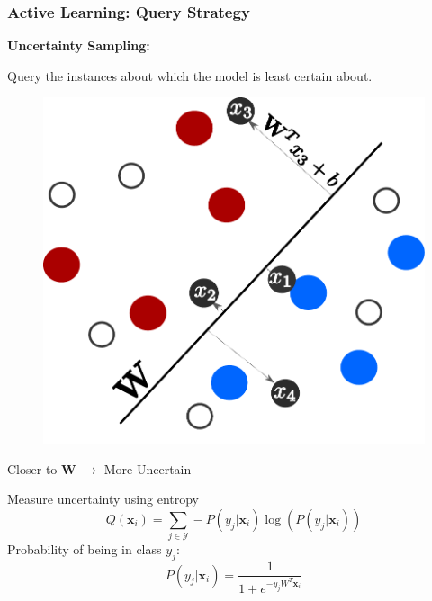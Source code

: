 \documentclass[11pts]{beamer}
\begin{document}
\begin{frame}%
\frametitle{Active Learning: Query Strategy}
\textbf{Uncertainty Sampling:}

\vspace*{0.2cm}
Query the instances about which the model is least certain about.

\vspace*{0.35cm}
\begin{minipage}{0.45\textwidth}
\begin{figure}
  \begin{center}
    \includegraphics[scale=0.35]{IM/UN_M.pdf}
  \end{center}
\end{figure}

\end{minipage}
\hfill
\begin{minipage}{0.5\textwidth}
Closer to  $\mathbf{W}$ $\rightarrow$ 
More Uncertain

\vspace*{0.2cm}
Measure uncertainty using entropy
\begin{equation*}
    Q(\mathbf{x}_{i}) = \sum_{j\in \mathcal{Y}}-P(y_{j}|\mathbf{x}_{i})\log\left(P(y_{j}|\mathbf{x}_{i})\right)
\end{equation*}
Probability of being in class $y_{j}$:
\begin{equation*}
    P(y_{j}|\mathbf{x}_{i})=\frac{1}{1+e^{-y_{j}W^{T}\mathbf{x}_{i}}}
\end{equation*}


\end{minipage}
\end{frame}
\end{document}
